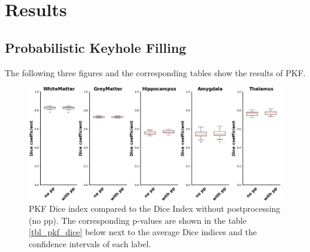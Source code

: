 \documentclass[journal]{IEEEtran}
\begin{document}
\section{Results}

\newcommand{\expnumber}[2]{{#1}\mathrm{e}{#2}}
\subsection{Probabilistic Keyhole Filling}
The following three figures and the corresponding tables show the results of PKF.

\begin{figure}[ht]
\centering
\includegraphics[width=\textwidth]{MIALab_Report/img/boxplots/PKF-Dice.png}
\caption{PKF Dice index compared to the Dice Index without postprocessing (no pp). The corresponding p-values are shown in the table \ref{tbl_pkf_dice} below next to the average Dice indices and the confidence intervals of each label.}
\label{fig_pkf_dice}
\end{figure}
\end{document}
